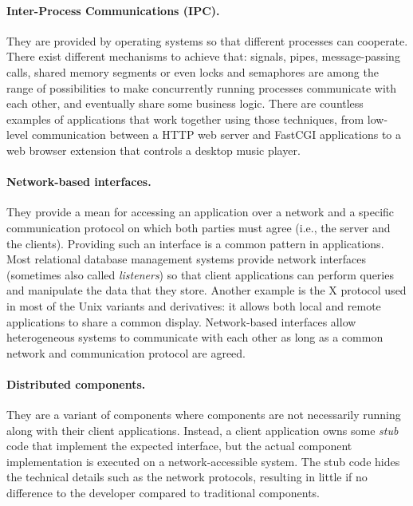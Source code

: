 \paragraph{Inter-Process Communications (IPC).}
They are provided by operating systems so that different processes can cooperate. There exist different mechanisms to achieve that: signals, pipes, message-passing calls, shared memory segments or even locks and semaphores are among the range of possibilities to make concurrently running processes communicate with each other, and eventually share some business logic. There are countless examples of applications that work together using those techniques, from low-level communication between a HTTP web server and FastCGI applications to a web browser extension that controls a desktop music player.\\
  
\paragraph{Network-based interfaces.}
They provide a mean for accessing an application over a network and a specific communication protocol on which both parties must agree (i.e., the server and the clients). Providing such an interface is a common pattern in applications. Most relational database management systems provide network interfaces (sometimes also called \emph{listeners}) so that client applications can perform queries and manipulate the data that they store. Another example is the X protocol used in most of the Unix variants and derivatives: it allows both local and remote applications to share a common display. Network-based interfaces allow heterogeneous systems to communicate with each other as long as a common network and communication protocol are agreed.\\
  
\paragraph{Distributed components.}
They are a variant of components where components are not necessarily running along with their client applications. Instead, a client application owns some \emph{stub} code that implement the expected interface, but the actual component implementation is executed on a network-accessible system. The stub code hides the technical details such as the network protocols, resulting in little if no difference to the developer compared to traditional components. \\

